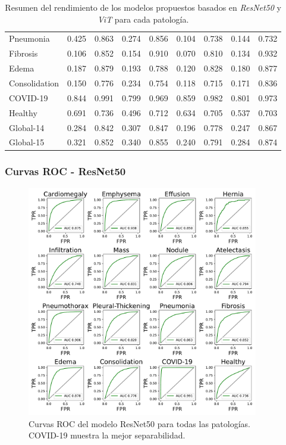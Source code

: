 \begin{frame}
\begin{table}[ht!]
\begin{tabular}{|l||c|c|c|c||c|c|c|c|}
        Pneumonia       & 0.425 & 0.863 & 0.274 & 0.856 & 0.104 & 0.738 & 0.144 & 0.732 \\
        Fibrosis        & 0.106 & 0.852 & 0.154 & 0.910 & 0.070 & 0.810 & 0.134 & 0.932 \\
        Edema           & 0.187 & 0.879 & 0.193 & 0.788 & 0.120 & 0.828 & 0.180 & 0.877 \\
        Consolidation   & 0.150 & 0.776 & 0.234 & 0.754 & 0.118 & 0.715 & 0.171 & 0.836 \\
        \hline
        COVID-19        & 0.844 & 0.991 & 0.799 & 0.969 & 0.859 & 0.982 & 0.801 & 0.973 \\
        Healthy         & 0.691 & 0.736 & 0.496 & 0.712 & 0.634 & 0.705 & 0.537 & 0.703 \\
        \hline\hline
        Global-14       & 0.284 & 0.842 & 0.307 & 0.847 & 0.196 & 0.778 & 0.247 & 0.867 \\
        Global-15       & 0.321 & 0.852 & 0.340 & 0.855 & 0.240 & 0.791 & 0.284 & 0.874 \\
        \hline
    \end{tabular}
    \caption{Resumen del rendimiento de los modelos propuestos basados en \textit{ResNet50} y \textit{ViT} para cada patología.}
    \label{table:res-vit-model-covid}
\end{table}
\end{frame}

\begin{frame}
\frametitle{Curvas ROC - ResNet50}
\begin{figure}[ht!]
    \centering
    \includegraphics[width=0.9\textwidth]{../Chapters/4. ViT-Lung/images/ROC_AUC.pdf}
    \caption{Curvas ROC del modelo ResNet50 para todas las patologías. COVID-19 muestra la mejor separabilidad.}
\end{figure}
\end{frame}


